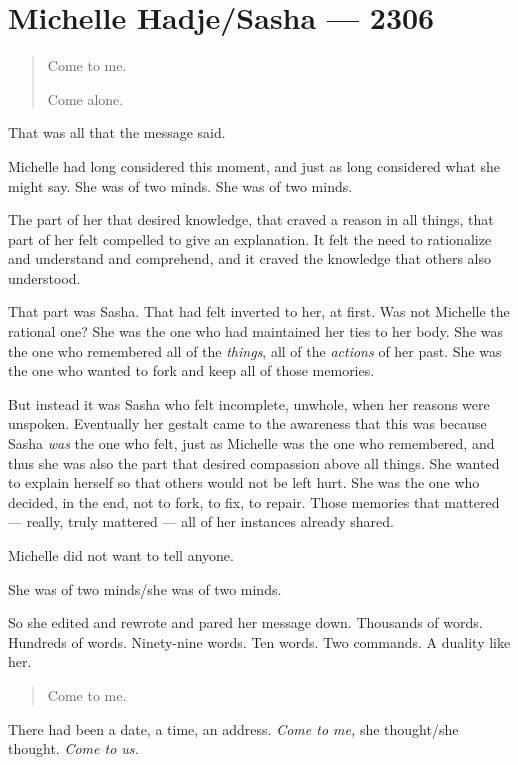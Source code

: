 \hypertarget{michelle-hadjesasha-2306}{%
\chapter{Michelle Hadje/Sasha — 2306}\label{michelle-hadjesasha-2306}}

\begin{quote}
Come to me.

Come alone.
\end{quote}

That was all that the message said.

Michelle had long considered this moment, and just as long considered what she might say. She was of two minds. She was of two minds.

The part of her that desired knowledge, that craved a reason in all things, that part of her felt compelled to give an explanation. It felt the need to rationalize and understand and comprehend, and it craved the knowledge that others also understood.

That part was Sasha. That had felt inverted to her, at first. Was not Michelle the rational one? She was the one who had maintained her ties to her body. She was the one who remembered all of the \emph{things}, all of the \emph{actions} of her past. She was the one who wanted to fork and keep all of those memories.

But instead it was Sasha who felt incomplete, unwhole, when her reasons were unspoken. Eventually her gestalt came to the awareness that this was because Sasha \emph{was} the one who felt, just as Michelle was the one who remembered, and thus she was also the part that desired compassion above all things. She wanted to explain herself so that others would not be left hurt. She was the one who decided, in the end, not to fork, to fix, to repair. Those memories that mattered — really, truly mattered — all of her instances already shared.

Michelle did not want to tell anyone.

She was of two minds/she was of two minds.

So she edited and rewrote and pared her message down. Thousands of words. Hundreds of words. Ninety-nine words. Ten words. Two commands. A duality like her.

\begin{quote}
Come to me.
\end{quote}

There had been a date, a time, an address. \emph{Come to me,} she thought/she thought. \emph{Come to us.}

